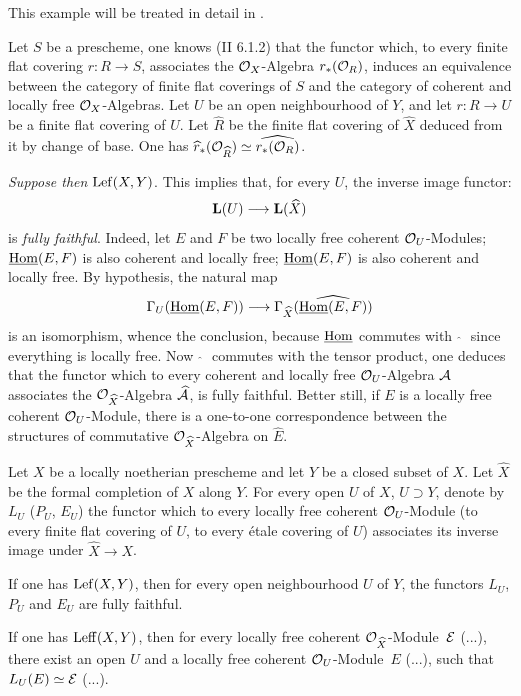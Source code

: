 This example will be treated in detail in \Exp {}.

Let $S$ be a prescheme, one knows (\EGA II 6.1.2) that the functor
which, to every finite flat covering $r\colon R\to S$, associates the
$\mathcal{O}_X$-Algebra $r_\ast({\mathcal O}_R)$, induces an equivalence between the
category of finite flat coverings of $S$ and the category of coherent
and locally free $\mathcal{O}_X$-Algebras. Let $U$ be an open neighbourhood of
$Y$, and let $r\colon R\to U$ be a finite flat covering of $U$. Let
$\hat{R}$ be the finite flat covering of $\hat{X}$ deduced from it by
change of base. One has $\widehat{r}_\ast({\mathcal O}_{\widehat{R}})\simeq\widehat{r_\ast({\mathcal O}_R)}$.

\emph{Suppose then} $\operatorname{Lef}(X, Y)$. This implies that, for every $U$, the
inverse image functor:
\[
\LL(U) \to \LL(\hat{X})
\]
is \emph{fully faithful}. Indeed, let $E$ and $F$ be two locally free
coherent ${\mathcal O}_U$-Modules; $\operatorname{\underline{Hom}}(E, F)$ is also coherent and
locally free; $\operatorname{\underline{Hom}}(E, F)$ is also coherent and locally free. By
hypothesis, the natural map
\[
\Gamma_U (\SheafHom(E, F)) \to \Gamma_{\hat{X}}(\widehat{\SheafHom(E, F)})
\]
is an isomorphism, whence the conclusion, because $\operatorname{\underline{Hom}}$ commutes
with $\, \, \hat{}\, \,$ since everything is locally free. Now
$\, \, \hat{}\, \,$ commutes with the tensor product, one deduces that
the functor which to every coherent and locally free ${\mathcal O}_U$-Algebra
${\mathcal A}$ associates the ${\mathcal O}_{\widehat{X}}$-Algebra $\widehat{{\mathcal A}}$, is fully
faithful. Better still, if $E$ is a locally free coherent
${\mathcal O}_U$-Module, there is a one-to-one correspondence between the
structures of commutative ${\mathcal O}_{\widehat{X}}$-Algebra on $\hat{E}$.

\begin{proposition} \label{X.2.3}
Let $X$ be a locally noetherian prescheme and let $Y$ be a closed
subset of $X$. Let $\hat{X}$ be the formal completion of $X$ along
$Y$. For every open $U$ of $X$, $U\supset Y$, denote by $L_U$
(\resp $P_U$, \resp $E_U$) the functor which to every locally free
coherent ${\mathcal O}_U$-Module (\resp to every finite flat covering of $U$,
\resp to every \'etale covering of $U$) associates its inverse image
under $\hat{X} \to X$.
\begin{enumeratei}
\item
If one has $\operatorname{Lef}(X, Y)$, then for every open neighbourhood $U$ of $Y$,
the functors $L_U$, $P_U$ and $E_U$ are fully faithful.

\item
If one has $\operatorname{Leff}(X, Y)$, then for every locally free coherent
${\mathcal O}_{\widehat{X}}$-Module~${\mathcal E}$ (\resp ...), there exist an open $U$ and a
locally free coherent ${\mathcal O}_U$-Module~$E$ (\resp ...), such that
$L_U(E) \simeq {\mathcal E}$ (\resp ...).
\end{enumeratei}
\end{proposition}

